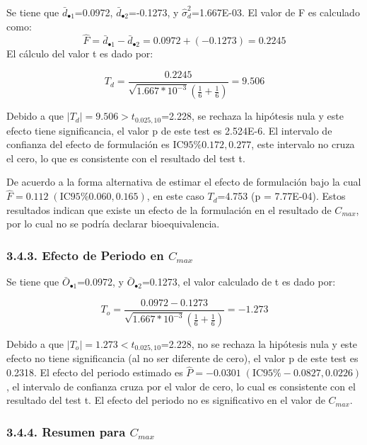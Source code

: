 \documentclass[]{article}
\begin{document}
Se tiene que \(\bar{d}_{\bullet1}\)=0.0972,
\(\bar{d}_{\bullet2}\)=-0.1273, y \(\hat{\sigma}_{d}^{2}\)=1.667E-03. El
valor de F es calculado como:
\[\hat{F} = \bar{d}_{\bullet1} - \bar{d}_{\bullet2} = 0.0972 + (-0.1273) = 0.2245\]
El cálculo del valor t es dado por:

\[T_{d}=\frac{0.2245}{\sqrt{1.667*10^{-3}}\left(\frac{1}{6}+\frac{1}{6}\right)}=9.506\]

Debido a que \(\left|T_{d}\right|=9.506>t_{0.025,10}\)=2.228, se rechaza
la hipótesis nula y este efecto tiene significancia, el valor p de este
test es 2.524E-6. El intervalo de confianza del efecto de formulación es
\(\textrm{IC95}\%0.172,0.277\), este intervalo no cruza el cero, lo que
es consistente con el resultado del test t.

De acuerdo a la forma alternativa de estimar el efecto de formulación
bajo la cual \(\hat{F}=0.112\;(\textrm{IC95}\%0.060,0.165)\), en este
caso \(T_{d}\)=4.753 (p = 7.77E-04). Estos resultados indican que existe
un efecto de la formulación en el resultado de \(C_{max}\), por lo cual
no se podría declarar bioequivalencia.

\subsubsection{\texorpdfstring{3.4.3. Efecto de Periodo en
\(C_{max}\)}{3.4.3. Efecto de Periodo en C\_\{max\}}}\label{efecto-de-periodo-en-c_max}

Se tiene que \(\bar{O}_{\bullet1}\)=0.0972, y
\(\bar{O}_{\bullet2}\)=0.1273, el valor calculado de t es dado por:

\[T_{o}=\frac{0.0972-0.1273}{\sqrt{1.667*10^{-3}}\left(\frac{1}{6}+\frac{1}{6}\right)}=-1.273\]

Debido a que \(\left|T_{o}\right|=1.273<t_{0.025,10}\)=2.228, no se
rechaza la hipótesis nula y este efecto no tiene significancia (al no
ser diferente de cero), el valor p de este test es 0.2318. El efecto del
periodo estimado es
\(\hat{P}=-0.0301\;(\textrm{IC95}\%-0.0827,0.0226)\), el intervalo de
confianza cruza por el valor de cero, lo cual es consistente con el
resultado del test t. El efecto del periodo no es significativo en el
valor de \(C_{max}\).

\subsubsection{\texorpdfstring{3.4.4. Resumen para
\(C_{max}\)}{3.4.4. Resumen para C\_\{max\}}}\label{resumen-para-c_max}
\end{document}
